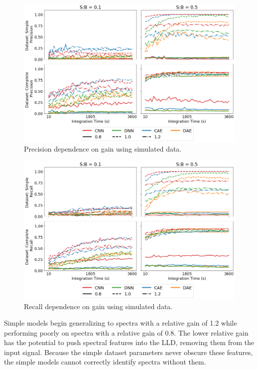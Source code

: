 \begin{figure}[H]
	\centering
	\includegraphics[width=1.0\linewidth]{images/sim-generalization-cal-precision}
	\caption{Precision dependence on gain using simulated data.}
	\label{fig:sim-generalization-cal-precision}
\end{figure}

\begin{figure}[H]
	\centering
	\includegraphics[width=1.0\linewidth]{images/sim-generalization-cal-recall}
	\caption{Recall dependence on gain using simulated data.}
	\label{fig:sim-generalization-cal-recall}
\end{figure}

Simple models begin generalizing to spectra with a relative gain of 1.2 while performing poorly on spectra with a relative gain of 0.8. The lower relative gain has the potential to push spectral features into the LLD, removing them from the input signal. Because the simple dataset parameters never obscure these features, the simple models cannot correctly identify spectra without them.


